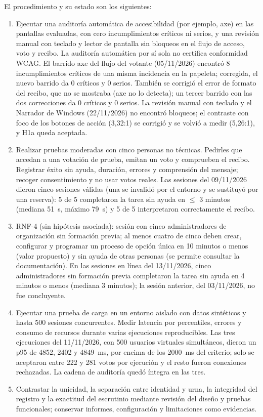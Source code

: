 El procedimiento y su estado son los siguientes:
\begin{enumerate}
  \item [H1a ACEPTADA] Ejecutar una auditoría automática de accesibilidad (por ejemplo,
  axe) en las pantallas evaluadas, con cero incumplimientos críticos ni
  serios, y una revisión manual con teclado y lector de pantalla sin bloqueos
  en el flujo de acceso, voto y recibo. La auditoría automática por sí sola no
  certifica conformidad WCAG. El barrido axe del flujo del votante
  (05/11/2026) encontró 8 incumplimientos críticos de una misma incidencia en
  la papeleta; corregida, el nuevo barrido da 0 críticos y 0 serios. También
  se corrigió el error de formato del recibo, que no se mostraba (axe no lo
  detecta); un tercer barrido con las dos correcciones da 0 críticos y 0
  serios. La revisión manual con teclado y el Narrador de Windows (22/11/2026)
  no encontró bloqueos; el contraste con foco de los botones de acción
  (3,32:1) se corrigió y se volvió a medir (5,26:1), y H1a queda aceptada.
  \item [H1b ACEPTADA] Realizar pruebas moderadas con cinco personas no técnicas.
  Pedirles que accedan a una votación de prueba, emitan un voto y comprueben
  el recibo. Registrar éxito sin ayuda, duración, errores y comprensión del
  mensaje; recoger consentimiento y no usar votos reales. Las sesiones del
  09/11/2026 dieron cinco sesiones válidas (una se invalidó por el entorno y se
  sustituyó por una reserva): 5 de 5 completaron la tarea sin ayuda en
  $\leq$ 3 minutos (mediana 51~s, máximo 79~s) y 5 de 5 interpretaron
  correctamente el recibo.
  \item [RNF-4 ACEPTADO] RNF-4 (sin hipótesis asociada): sesión con cinco
  administradores de organización sin formación previa; al menos cuatro de
  cinco deben crear, configurar y programar un proceso de opción única en
  10 minutos o menos (valor propuesto) y sin ayuda de otras personas (se
  permite consultar la documentación). En las sesiones en línea del 13/11/2026,
  cinco administradores sin formación previa completaron la tarea sin ayuda en
  4 minutos o menos (mediana 3 minutos); la sesión anterior, del 03/11/2026, no
  fue concluyente.
  \item [H1c RECHAZADA] Ejecutar una prueba de carga en un entorno aislado con datos
  sintéticos y hasta 500 sesiones concurrentes. Medir latencia por percentiles,
  errores y consumo de recursos durante varias ejecuciones reproducibles. Las
  tres ejecuciones del 11/11/2026, con 500 usuarios virtuales simultáneos, dieron
  un p95 de 4852, 2402 y 4849~ms, por encima de los 2000~ms del criterio; solo
  se aceptaron entre 222 y 281 votos por ejecución y el resto fueron
  conexiones rechazadas. La cadena de auditoría quedó íntegra en las tres.
  \item Contrastar la unicidad, la separación entre identidad y urna, la
  integridad del registro y la exactitud del escrutinio mediante revisión del
  diseño y pruebas funcionales; conservar informes, configuración y
  limitaciones como evidencias.
\end{enumerate}

